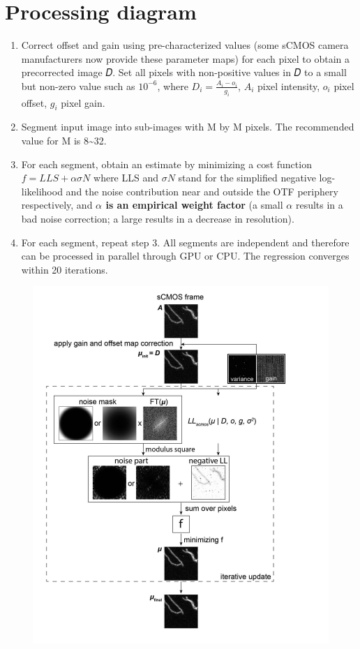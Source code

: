 \documentclass[11pt]{article}
\makeatletter
\def\maxwidth{\ifdim\Gin@nat@width>\linewidth\linewidth
    \else\Gin@nat@width\fi}
\let\Oldincludegraphics\includegraphics
\renewcommand{\includegraphics}[1]{\Oldincludegraphics[width=.8\maxwidth]{#1}}
\providecommand{\tightlist}{%
      \setlength{\itemsep}{0pt}\setlength{\parskip}{0pt}}
\makeatother
\begin{document}
    \section{Processing diagram}\label{processing-diagram}

\begin{enumerate}
\def\labelenumi{\arabic{enumi}.}
\tightlist
\item
  Correct offset and gain using pre-characterized values (some sCMOS
  camera manufacturers now provide these parameter maps) for each pixel
  to obtain a precorrected image 𝐷. Set all pixels with non-positive
  values in 𝐷 to a small but non-zero value such as \(10^{-6}\), where
  \(D_i =\frac{A_i - o_i}{g_i}\), \(A_i\) pixel intensity, \(o_i\) pixel
  offset, \(g_i\) pixel gain.
\item
  Segment input image into sub-images with M by M pixels. The
  recommended value for M is 8\textasciitilde{}32.
\item
  For each segment, obtain an estimate by minimizing a cost function
  \(f = LLS + \alpha\sigma N\) where LLS and \(\sigma N\) stand for the
  simplified negative log-likelihood and the noise contribution near and
  outside the OTF periphery respectively, and \textbf{\(\alpha\) is an
  empirical weight factor} (a small \(\alpha\) results in a bad noise
  correction; a large \alpha results in a decrease in resolution).
\item
  For each segment, repeat step 3. All segments are independent and
  therefore can be processed in parallel through GPU or CPU. The
  regression converges within 20 iterations.
\end{enumerate}

\begin{figure}
\centering
\includegraphics{nmeth.4379-S1.jpg}
\caption{}
\end{figure}
\end{document}
